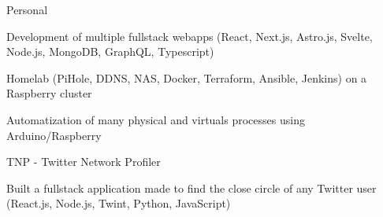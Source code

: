 
\begin{cventries}
  \cventry
    {} %
    {Personal} %
    {} %
    {} %
    {
      \begin{cvitems} %
        \item {Development of multiple fullstack webapps (React, Next.js, Astro.js, Svelte, Node.js, MongoDB, GraphQL, Typescript)}
        \item {Homelab (PiHole, DDNS, NAS, Docker, Terraform, Ansible, Jenkins) on a Raspberry cluster}
		\item {Automatization of many physical and virtuals processes using Arduino/Raspberry}
      \end{cvitems}
    }

  \cventry
    {} %
    {TNP - Twitter Network Profiler} %
    {} %
    {} %
    {
      \begin{cvitems} %
      	\item {Built a fullstack application made to find the close circle of any Twitter user (React.js, Node.js, Twint, Python, JavaScript)}
      \end{cvitems}
    }
\end{cventries}